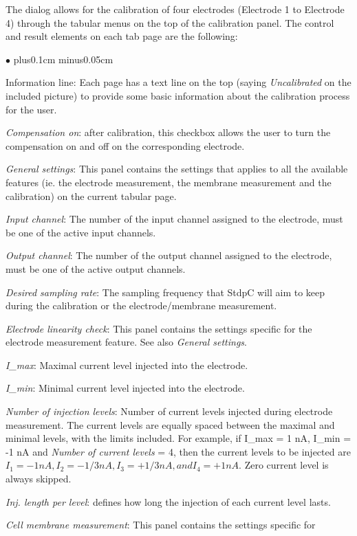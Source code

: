 \documentclass{article}
\newenvironment{myitem}{\begin{list}{$\bullet$}{\setlength{\leftmargin}{1.1em}
\itemsep0.1cm plus0.1cm minus0.05cm
\listparindent0cm
\addtolength{\labelsep}{0.5\labelsep}
\setlength{\labelwidth}{0.8em}
\setlength{\leftmargin}{\labelwidth}
\addtolength{\leftmargin}{\labelsep}
}}{\end{list}}
\begin{document}
The dialog allows for the calibration of four electrodes (Electrode 1 to
Electrode 4) through the tabular menus on the top of the calibration
panel. The control and result elements on each tab page are the following:  
\begin{myitem}
\item Information line: Each page has a text line on the top (saying
  \emph{Uncalibrated} on the included picture) to provide some basic
  information about the calibration process for the user. 
\item \emph{Compensation on}: after calibration, this checkbox allows the
  user to turn the compensation on and off on the corresponding electrode.
\item \emph{General settings}: This panel contains the settings that
  applies to all the available features (ie. the electrode measurement, the
  membrane measurement and the calibration) on the current tabular page.
\item \emph{Input channel}: The number of the input channel assigned to the
  electrode, must be one of the active input channels.
\item \emph{Output channel}: The number of the output channel assigned to the
  electrode, must be one of the active output channels.
\item \emph{Desired sampling rate}: The sampling frequency that StdpC will
  aim to keep during the calibration or the electrode/membrane measurement.
\item \emph{Electrode linearity check}: This panel contains the settings specific for
  the electrode measurement feature. See also \emph{General settings}.
\item \emph{I\_max}: Maximal current level injected into the electrode.
\item \emph{I\_min}: Minimal current level injected into the electrode.
\item \emph{Number of injection levels}: Number of current levels
  injected during electrode measurement. The current levels are equally
  spaced between the maximal and minimal levels, with the limits
  included. For example, if I\_max = 1 nA, I\_min = -1 nA and \emph{Number of
  current levels} = 4, then the current levels to be injected are $I_1 =
  -1 nA, I_2 = -1/3 nA, I_3 = +1/3 nA, and I_4 = +1 nA$. Zero current level
  is always skipped.
\item \emph{Inj. length per level}: defines how long the injection of each
  current level lasts. 
\item \emph{Cell membrane measurement}: This panel contains the settings specific for

\end{myitem}
\end{document}
